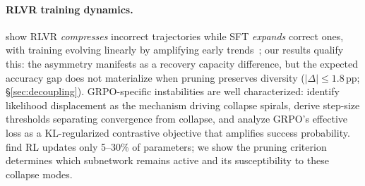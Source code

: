 \paragraph{RLVR training dynamics.}
\citet{rlsqueezes2026} show RLVR \emph{compresses} incorrect trajectories while SFT \emph{expands} correct ones, with training evolving linearly by amplifying early trends~\citep{wang2026linearity}; our results qualify this: the asymmetry manifests as a recovery capacity difference, but the expected accuracy gap does not materialize when pruning preserves diversity ($|\Delta| \leq 1.8$\,pp; \S\ref{sec:decoupling}).
GRPO-specific instabilities are well characterized: \citet{deng2025grpocollapse} identify likelihood displacement as the mechanism driving collapse spirals, \citet{suk2025rlvrdynamics} derive step-size thresholds separating convergence from collapse, and \citet{mroueh2025grpodynamics} analyze GRPO's effective loss as a KL-regularized contrastive objective that amplifies success probability.
\citet{mukherjee2025rlsubnetworks} find RL updates only 5--30\% of parameters; we show the pruning criterion determines which subnetwork remains active and its susceptibility to these collapse modes.
